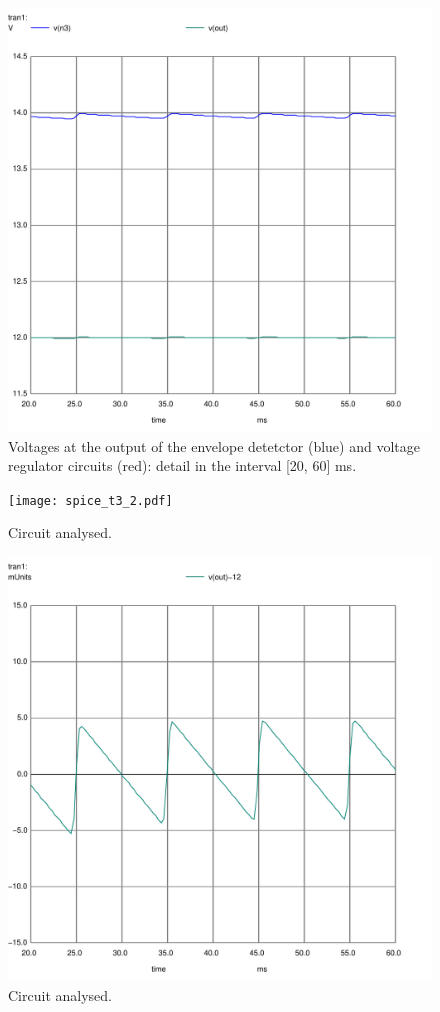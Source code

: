 \begin{figure}[h] \centering
  \includegraphics[scale=0.5]{Spice_t3_Zoom.pdf}
  \caption{Voltages at the output of the envelope detetctor (blue) and voltage regulator circuits (red): detail in the interval [20, 60] ms.}
  \label{fig:33}
\end{figure}

\begin{figure}[h] \centering
  \texttt{[image: spice\_t3\_2.pdf]}
  \caption{Circuit analysed.}
  \label{fig:22}
\end{figure}

\begin{figure}[h] \centering
  \includegraphics[scale=0.5]{Spice_t3_2_Zoom.pdf}
  \caption{Circuit analysed.}
  \label{fig:44}
\end{figure}


